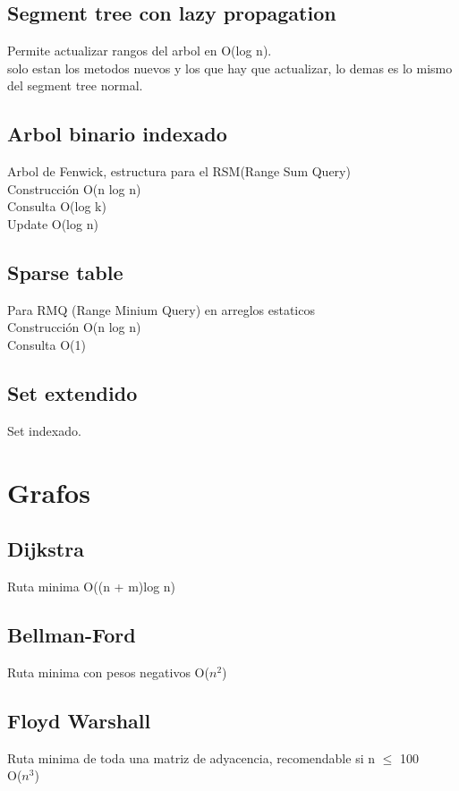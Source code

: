 \documentclass[10pt,landscape,twocolumn,a4paper,notitlepage]{article}
\newcommand\cppfile[2][]{

}
\begin{document}
			\subsection{Segment tree con lazy propagation}
			Permite actualizar rangos del arbol en O(log n).\\
			solo estan los metodos nuevos y los que hay que actualizar, 
			lo demas es lo mismo del segment tree normal.
			\cppfile[29-84]{estructuras_de_datos/segment_tree_lazy_propagation.cpp}
			\subsection{Arbol binario indexado}
			Arbol de Fenwick, estructura para el RSM(Range Sum Query)\\
			Construcción O(n log n) \\Consulta O(log k)\\Update O(log n)
			\cppfile[8-35]{estructuras_de_datos/arbol_binario_indexado.cpp}
			\subsection{Sparse table}
			Para RMQ (Range Minium Query) en arreglos estaticos\\
			Construcción O(n log n)\\Consulta O(1)
			\cppfile[8-35]{estructuras_de_datos/Sparse_table.cpp}
			\subsection{Set extendido}
			Set indexado.
			\cppfile[2-10]{estructuras_de_datos/set_extendido.cpp}
			
		\section{Grafos}
			\subsection{Dijkstra}
			Ruta minima
			O((n + m)log n)
			\cppfile[12-46]{grafos/dijkstra.cpp}
			\subsection{Bellman-Ford}
			Ruta minima con pesos negativos
			O($n^{2}$)
			\cppfile[12-33]{grafos/bellman-Ford.cpp}
			\subsection{Floyd Warshall}
			Ruta minima de toda una matriz de adyacencia, recomendable si n $\leq$ 100\\	
			O($n^{3}$)
			\cppfile[8-36]{grafos/floyd.cpp}
\end{document}
